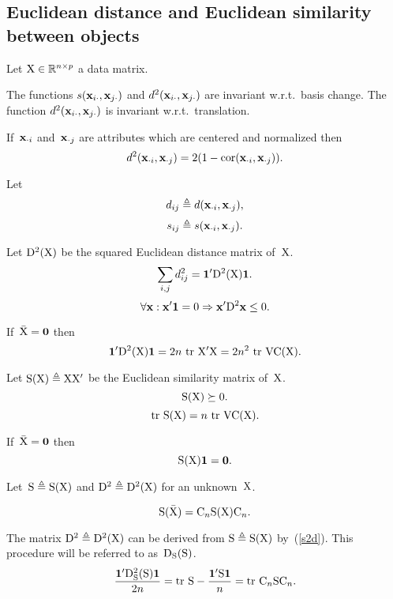 \documentclass[10pt,a4paper]{article}
\theoremstyle{plain} \newtheorem{Lem}{Lemma}
\begin{document}
\subsection {Euclidean distance and Euclidean similarity between objects}
Let $\mathrm X \in \mathbb R^{n \times p}$ a data matrix.

The functions $s(\mathbf x_{i \cdot}, \mathbf x_{j \cdot})$ and $d^2(\mathbf x_{i \cdot}, \mathbf x_{j \cdot})$ are invariant w.r.t.~basis change.
The function $d^2(\mathbf x_{i\cdot}, \mathbf x_{j\cdot})$ is invariant w.r.t.~translation.

If~$\mathbf x_{\cdot i}$ and~$\mathbf x_{\cdot j}$ are attributes which are centered and normalized 
then 
\begin{equation}\label{d2rho}
d^2(\mathbf x_{\cdot i}, \mathbf x_{\cdot j}) = 2 (1 - \mathrm {cor}(\mathbf x_{\cdot i}, \mathbf x_{\cdot j})).
\end{equation}

Let 
$$ d_{ij} \triangleq d(\mathbf x_{\cdot i}, \mathbf x_{\cdot j}), $$
$$ s_{ij} \triangleq s(\mathbf x_{\cdot i}, \mathbf x_{\cdot j}). $$

Let $\mathrm D^2(\mathrm X)$ be the squared Euclidean distance matrix of~$\mathrm X$.
$$ \sum_{i,j} d^2_{ij} = \mathbf 1' \mathrm D^2(\mathrm X) \mathbf 1. $$
$$ \forall \mathbf x : \mathbf x' \mathbf 1 = 0 \Rightarrow \mathbf x' \mathrm D^2 \mathbf x \le 0. $$

If~$\bar {\mathrm X} = \mathbf 0$ then
\begin{equation}\label{sumD2}
\mathbf 1' \mathrm D^2(\mathrm X) \mathbf 1 = 2n \ \mathrm {tr} \  \mathrm X' \mathrm X  = 2n^2 \ \mathrm {tr} \  \mathrm {VC} (\mathrm X). 
\end{equation}

Let $\mathrm S(\mathrm X) \triangleq \mathrm X \mathrm X'$ be the Euclidean similarity matrix of~$\mathrm X$.
$$\mathrm S(\mathrm X) \succeq 0. $$
\begin{equation}\label{trc_S_VC}
  \mathrm {tr} \  \mathrm S(\mathrm X) = n \ \mathrm {tr} \  \mathrm {VC}(\mathrm X). 
\end{equation}

If~$\bar {\mathrm X} = \mathbf 0$ then 
$$ \mathrm S(\mathrm X) \mathbf 1 = \mathbf 0. $$

Let~$\mathrm S \triangleq \mathrm S(\mathrm X)$ and $\mathrm D^2 \triangleq \mathrm D^2 (\mathrm X)$ for an unknown~$\mathrm X$.

$$ \mathrm S(\bar {\mathrm X}) =  \mathrm C_n {\mathrm S} (\mathrm X)  \mathrm C_n. $$

The matrix $\mathrm D^2 \triangleq \mathrm D^2(\mathrm X)$ can be derived from $\mathrm S \triangleq \mathrm S (\mathrm X)$ by~(\ref{s2d}).
This procedure will be referred to as~$\mathrm D_{\mathrm S}(\mathrm S)$.
$$ \frac {\mathbf 1' \mathrm D_{\mathrm S}^2(\mathrm S) \mathbf 1} {2n} = \mathrm {tr} \  \mathrm S - \frac {\mathbf 1' \mathrm S \mathbf 1} n = \mathrm {tr} \  \mathrm C_n \mathrm S \mathrm C_n. $$
\end{document}
